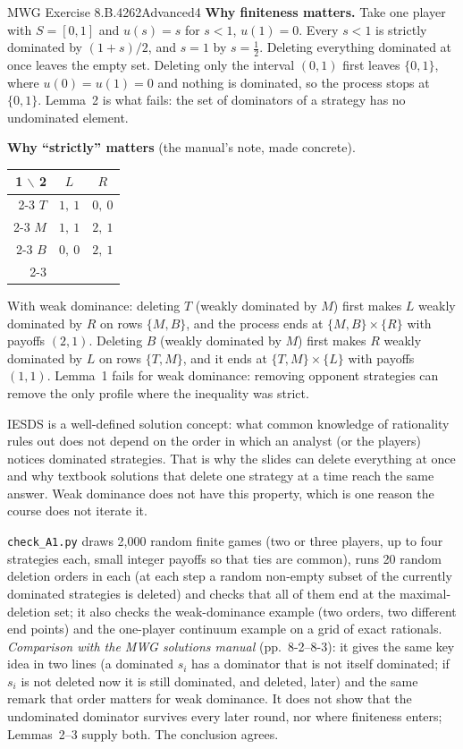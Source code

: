 \begin{exsol}{MWG Exercise 8.B.4}{262}{Advanced}{4}
\textbf{Why finiteness matters.} Take one player with $S = [0,1]$ and $u(s) = s$ for $s < 1$,
$u(1) = 0$. Every $s < 1$ is strictly dominated by $(1+s)/2$, and $s = 1$ by $s = \tfrac12$.
Deleting everything dominated at once leaves the empty set. Deleting only the interval $(0,1)$
first leaves $\{0, 1\}$, where $u(0) = u(1) = 0$ and nothing is dominated, so the process stops at
$\{0,1\}$. Lemma~2 is what fails: the set of dominators of a strategy has no undominated element.

\textbf{Why ``strictly'' matters} (the manual's note, made concrete).
\begin{center}
\begin{tabular}{r|c|c|}
\multicolumn{1}{r}{1 $\backslash$ 2} & \multicolumn{1}{c}{$L$} & \multicolumn{1}{c}{$R$}\\ \cline{2-3}
$T$ & $1,\ 1$ & $0,\ 0$ \\ \cline{2-3}
$M$ & $1,\ 1$ & $2,\ 1$ \\ \cline{2-3}
$B$ & $0,\ 0$ & $2,\ 1$ \\ \cline{2-3}
\end{tabular}
\end{center}
With weak dominance: deleting $T$ (weakly dominated by $M$) first makes $L$ weakly dominated by $R$
on rows $\{M,B\}$, and the process ends at $\{M,B\}\times\{R\}$ with payoffs $(2,1)$. Deleting $B$
(weakly dominated by $M$) first makes $R$ weakly dominated by $L$ on rows $\{T,M\}$, and it ends at
$\{T,M\}\times\{L\}$ with payoffs $(1,1)$. Lemma~1 fails for weak dominance: removing opponent
strategies can remove the only profile where the inequality was strict.

\interp IESDS is a well-defined solution concept: what common knowledge of rationality rules out
does not depend on the order in which an analyst (or the players) notices dominated strategies.
That is why the slides can delete everything at once and why textbook solutions that delete one
strategy at a time reach the same answer. Weak dominance does not have this property, which is one
reason the course does not iterate it.

\verify \texttt{check\_A1.py} draws 2{,}000 random finite games (two or three players, up to four
strategies each, small integer payoffs so that ties are common), runs 20 random deletion orders in
each (at each step a random non-empty subset of the currently dominated strategies is deleted) and
checks that all of them end at the maximal-deletion set; it also checks the weak-dominance example
(two orders, two different end points) and the one-player continuum example on a grid of exact
rationals. \emph{Comparison with the MWG solutions manual} (pp.~8-2--8-3): it gives the same key idea in
two lines (a dominated $s_i$ has a dominator that is not itself dominated; if $s_i$ is not deleted
now it is still dominated, and deleted, later) and the same remark that order matters for weak
dominance. It does not show that the undominated dominator survives every later round, nor where
finiteness enters; Lemmas~2--3 supply both. The conclusion agrees.


\end{exsol}
